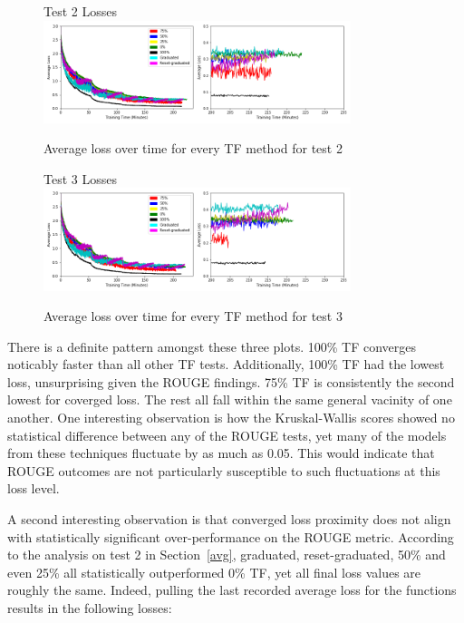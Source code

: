 \begin{figure}[h]
  \centering
  Test 2 Losses\\
  \includegraphics[width=0.8\textwidth]{../plots/test2comb}
  \caption{Average loss over time for every TF method for test 2}
  \label{fig:t2loss}
\end{figure}

\begin{figure}[h]
  \centering
  Test 3 Losses\\
  \includegraphics[width=0.8\textwidth]{../plots/test3comb}
  \caption{Average loss over time for every TF method for test 3}
  \label{fig:t3loss}
\end{figure}

There is a definite pattern amongst these three plots. 100\% TF converges noticably faster than all other TF tests. Additionally, 100\% TF had the lowest loss, unsurprising given the ROUGE findings. 75\% TF is consistently the second lowest for coverged loss. The rest all fall within the same general vacinity of one another. One interesting observation is how the Kruskal-Wallis scores showed no statistical difference between any of the ROUGE tests, yet many of the models from these techniques fluctuate by as much as 0.05. This would indicate that ROUGE outcomes are not particularly susceptible to such fluctuations at this loss level.

A second interesting observation is that converged loss proximity does not align with statistically significant over-performance on the ROUGE metric. According to the analysis on test 2 in Section~\ref{avg}, graduated, reset-graduated, 50\% and even 25\% all statistically outperformed 0\% TF, yet all final loss values are roughly the same. Indeed,  pulling the last recorded average loss for the functions results in the following losses:

